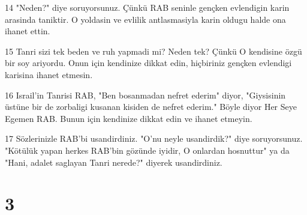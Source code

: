 \par 14 "Neden?" diye soruyorsunuz. Çünkü RAB seninle gençken evlendigin karin arasinda taniktir. O yoldasin ve evlilik antlasmasiyla karin oldugu halde ona ihanet ettin.
\par 15 Tanri sizi tek beden ve ruh yapmadi mi? Neden tek? Çünkü O kendisine özgü bir soy ariyordu. Onun için kendinize dikkat edin, hiçbiriniz gençken evlendigi karisina ihanet etmesin.
\par 16 Israil'in Tanrisi RAB, "Ben bosanmadan nefret ederim" diyor, "Giysisinin üstüne bir de zorbaligi kusanan kisiden de nefret ederim." Böyle diyor Her Seye Egemen RAB. Bunun için kendinize dikkat edin ve ihanet etmeyin.
\par 17 Sözlerinizle RAB'bi usandirdiniz. "O'nu neyle usandirdik?" diye soruyorsunuz. "Kötülük yapan herkes RAB'bin gözünde iyidir, O onlardan hosnuttur" ya da "Hani, adalet saglayan Tanri nerede?" diyerek usandirdiniz.

\chapter{3}

